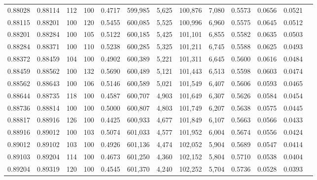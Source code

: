 \begin{tabular}{rrrrrrrrrrrrr}
0.88028 & 0.88114 &   112 & 100 &                                     0.4717 & 599,985 &   5,625 & 100,876 &   7,080 & 0.5573 & 0.0656 & 0.0521 \\
0.88115 & 0.88201 &   100 & 120 &                                     0.5455 & 600,085 &   5,525 & 100,996 &   6,960 & 0.5575 & 0.0645 & 0.0512 \\
0.88201 & 0.88284 &   100 & 105 &                                     0.5122 & 600,185 &   5,425 & 101,101 &   6,855 & 0.5582 & 0.0635 & 0.0503 \\
0.88284 & 0.88371 &   100 & 110 &                                     0.5238 & 600,285 &   5,325 & 101,211 &   6,745 & 0.5588 & 0.0625 & 0.0493 \\
0.88372 & 0.88459 &   104 & 100 &                                     0.4902 & 600,389 &   5,221 & 101,311 &   6,645 & 0.5600 & 0.0616 & 0.0484 \\
0.88459 & 0.88562 &   100 & 132 &                                     0.5690 & 600,489 &   5,121 & 101,443 &   6,513 & 0.5598 & 0.0603 & 0.0474 \\
0.88562 & 0.88643 &   100 & 106 &                                     0.5146 & 600,589 &   5,021 & 101,549 &   6,407 & 0.5606 & 0.0593 & 0.0465 \\
0.88644 & 0.88735 &   118 & 100 &                                     0.4587 & 600,707 &   4,903 & 101,649 &   6,307 & 0.5626 & 0.0584 & 0.0454 \\
0.88736 & 0.88814 &   100 & 100 &                                     0.5000 & 600,807 &   4,803 & 101,749 &   6,207 & 0.5638 & 0.0575 & 0.0445 \\
0.88817 & 0.88916 &   126 & 100 &                                     0.4425 & 600,933 &   4,677 & 101,849 &   6,107 & 0.5663 & 0.0566 & 0.0433 \\
0.88916 & 0.89012 &   100 & 103 &                                     0.5074 & 601,033 &   4,577 & 101,952 &   6,004 & 0.5674 & 0.0556 & 0.0424 \\
0.89012 & 0.89102 &   103 & 100 &                                     0.4926 & 601,136 &   4,474 & 102,052 &   5,904 & 0.5689 & 0.0547 & 0.0414 \\
0.89103 & 0.89204 &   114 & 100 &                                     0.4673 & 601,250 &   4,360 & 102,152 &   5,804 & 0.5710 & 0.0538 & 0.0404 \\
0.89204 & 0.89319 &   120 & 100 &                                     0.4545 & 601,370 &   4,240 & 102,252 &   5,704 & 0.5736 & 0.0528 & 0.0393 \\

\end{tabular}
